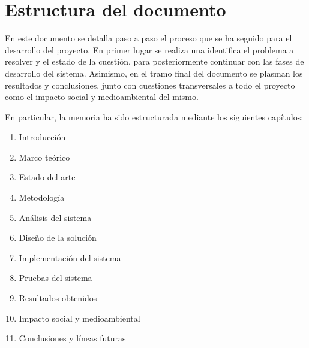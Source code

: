 \section{Estructura del documento}

    En este documento se detalla paso a paso el proceso que se ha seguido para el desarrollo del proyecto. En primer lugar se realiza una identifica el problema a resolver y el estado de la cuestión, para posteriormente continuar con las fases de desarrollo del sistema. Asimismo, en el tramo final del documento se plasman los resultados y conclusiones, junto con cuestiones transversales a todo el proyecto como el impacto social y medioambiental del mismo.
    
    
    En particular, la memoria ha sido estructurada mediante los siguientes capítulos:
    \begin{enumerate}
        \item Introducción
        \item Marco teórico
        \item Estado del arte
        \item Metodología 
        \item Análisis del sistema
        \item Diseño de la solución
        \item Implementación del sistema
        \item Pruebas del sistema
        \item Resultados obtenidos
        \item Impacto social y medioambiental
        \item Conclusiones y líneas futuras
    \end{enumerate}